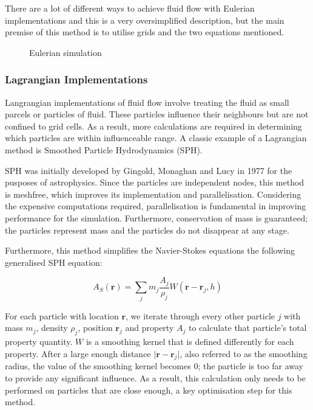 \documentclass[12pt]{article}
\newcommand{\wideimage}[2][]{%
  \makebox[\textwidth][c]{\texttt{[image: \#2]}}%
}
\begin{document}
    There are a lot of different ways to achieve fluid flow with Eulerian implementations and this is a very oversimplified description, but the main premise of this method is to utilise grids and the two equations mentioned.

    \begin{figure}[H]
        \begin{center}
            \noindent\wideimage[width=0.7\textwidth]{eulerianEG.png}
        \end{center}
        \caption{Eulerian simulation \cite{eulerianeg}}
    \end{figure}

    \subsubsection{Lagrangian Implementations}

    Langrangian implementations of fluid flow involve treating the fluid as small parcels or particles of fluid. These particles influence their neighbours but are not confined to grid cells. As a result, more calculations are required in determining which particles are within influenceable range. A classic example of a Lagrangian method is Smoothed Particle Hydrodynamics (SPH).

    SPH was initially developed by Gingold, Monaghan and Lucy in 1977 for the pusposes of astrophysics\cite{sca}. Since the particles are independent nodes, this method is meshfree, which improves its implementation and parallelisation. Considering the expensive computations required, parallelisation is fundamental in improving performance for the simulation. Furthermore, conservation of mass is guaranteed; the particles represent mass and the particles do not disappear at any stage.

    Furthermore, this method simplifies the Navier-Stokes equations the following generalised SPH equation:

    \begin{equation}
        A_S(\textbf{r}) = \sum_{j}{m_j \frac{A_j}{\rho_j}W(\textbf{r} - \textbf{r}_j, h)}
    \end{equation}

    For each particle with location $\textbf{r}$, we iterate through every other particle $j$ with mass $m_j$, density $\rho_j$, position $\textbf{r}_j$ and property $A_j$ to calculate that particle's total property quantity. $W$ is a smoothing kernel that is defined differently for each property. After a large enough distance $\lvert\textbf{r} - \textbf{r}_j\rvert$, also referred to as the smoothing radius, the value of the smoothing kernel becomes 0; the particle is too far away to provide any significant influence. As a result, this calculation only needs to be performed on particles that are close enough, a key optimisation step for this method.
\end{document}
